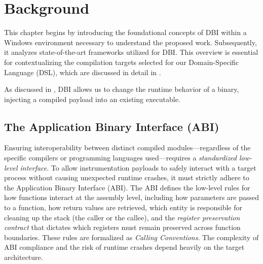 \chapter{Background}
\label{ch:background}

This chapter begins by introducing the foundational concepts of \ac{DBI} within a Windows environment necessary to understand the proposed work.
Subsequently, it analyzes state-of-the-art frameworks utilized for \ac{DBI}. This overview is essential for contextualizing the compilation targets selected for our Domain-Specific Language (DSL), which are discussed in detail in .

As discussed in , \ac{DBI} allows us to change the runtime behavior of a binary, injecting a compiled payload into an existing executable.

\section{The Application Binary Interface (ABI)}
\label{sec:abi}

Ensuring interoperability between distinct compiled modules—regardless of the specific compilers or programming languages used—requires a \emph{standardized low-level interface}.
To allow instrumentation payloads to safely interact with a target process without causing unexpected runtime crashes, it must strictly adhere to the Application Binary Interface (ABI).
The ABI defines the low-level rules for how functions interact at the assembly level, including how parameters are passed to a function, how return values are retrieved, which entity is responsible for cleaning up the stack (the caller or the callee), and the \emph{register preservation contract} that dictates which registers must remain preserved across function boundaries.
These rules are formalized as \emph{Calling Conventions}.
The complexity of ABI compliance and the risk of runtime crashes depend heavily on the target architecture.

